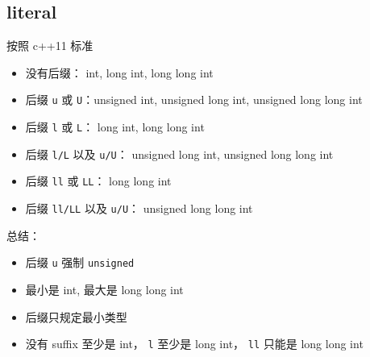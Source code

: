 \subsection{literal}
按照 c++11 标准
\begin{itemize}
\item 没有后缀： int, long int, long long int
\item 后缀 \verb|u| 或 \verb|U|：unsigned int, unsigned long int, unsigned long long int
\item 后缀 \verb|l| 或 \verb|L|： long int, long long int
\item 后缀 \verb|l/L| 以及 \verb|u/U|： unsigned long int, unsigned long long int
\item 后缀 \verb|ll| 或 \verb|LL|： long long int
\item 后缀 \verb|ll/LL| 以及 \verb|u/U|： unsigned long long int
\end{itemize}

总结：
\begin{itemize}
\item 后缀 \verb|u| 强制 \verb|unsigned|
\item 最小是 int, 最大是 long long int
\item 后缀只规定最小类型
\item 没有 suffix 至少是 int， \verb|l| 至少是 long int， \verb|ll| 只能是 long long int
\end{itemize}
